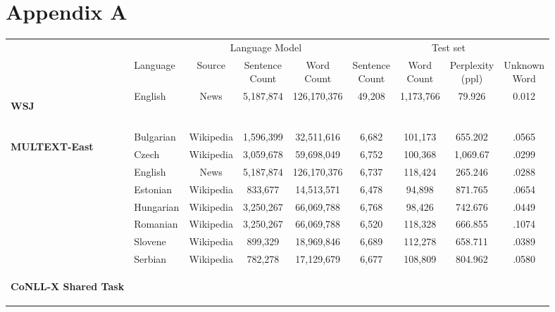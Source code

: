 \appendix
\section{Appendix A}
\label{app:lm}

\begin{table}[h]
  \begin{tabular}{l|l|c|c|c|c|c|c|c|}
    \cline{2-9}
    & & \multicolumn{3}{c|}{Language Model} & \multicolumn{4}{c|}{Test set}\\    \cline{2-9}
    & Language & Source & \specialcell{Sentence\\Count} & \specialcell{Word\\Count} & \specialcell{Sentence\\Count} & \specialcell{Word\\Count} & \specialcell{Perplexity\\(ppl)} & \specialcell{Unknown\\Word} \\ \cline{1-9}
    \multirow{1}{*}{\begin{sideways}\textbf{WSJ}\end{sideways}} 
    &English & News & 5,187,874 & 126,170,376 & 49,208 & 1,173,766 & 79.926 & 0.012\\
    & & & & && & &\\\hline
    \multirow{8}{*}{\begin{sideways}\textbf{MULTEXT-East}\end{sideways}}
    &Bulgarian& Wikipedia &1,596,399 & 32,511,616  & 6,682 & 101,173 & 655.202 & .0565\\
    &Czech & Wikipedia &3,059,678 & 59,698,049 & 6,752 & 100,368 & 1,069.67 & .0299\\
    &English & News & 5,187,874 & 126,170,376 & 6,737 & 118,424 & 265.246 & .0288\\
    &Estonian & Wikipedia &833,677 & 14,513,571 & 6,478 & 94,898 & 871.765 & .0654\\
    &Hungarian & Wikipedia &3,250,267& 66,069,788 & 6,768 & 98,426 & 742.676 & .0449\\
    &Romanian & Wikipedia &3,250,267&66,069,788  & 6,520 & 118,328 & 666.855 & .1074\\
    &Slovene & Wikipedia & 899,329&18,969,846 & 6,689 & 112,278 & 658.711 & .0389\\
    &Serbian & Wikipedia & 782,278 & 17,129,679 & 6,677 & 108,809 & 804.962 & .0580\\
    \hline %
    \multirow{10}{*}{\begin{sideways}\textbf{CoNLL-X Shared Task}\end{sideways}}

\end{tabular}
\end{table}
